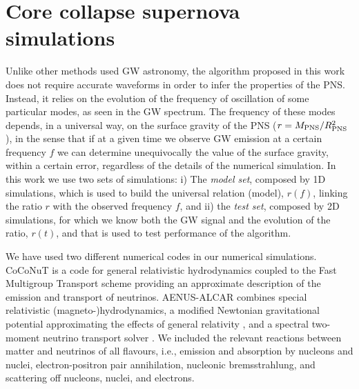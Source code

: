 \section{Core collapse supernova simulations}
\label{sec:simulations}



{Unlike other methods used GW astronomy, the} algorithm proposed in {this work} does not require accurate
waveforms {in order to infer the properties of the PNS.} {Instead, it relies on the evolution of the
frequency of oscillation of some particular modes, as seen in the GW spectrum.
The frequency of these modes depends, in a universal way, on the surface gravity of the PNS
($r=M_{\rm PNS}/R_{\rm PNS}^2$), in the sense that if at a given time we observe GW emission at a certain
frequency $f$ we can determine unequivocally the value of the surface gravity, within a certain error,
regardless of the details of the numerical simulation. In this work we use two sets of simulations: i)
The {\it model set}, composed by 1D simulations, which is used to build the universal relation (model),
$r(f)$, linking the ratio $r$ with the observed frequency $f$, and ii) the {\it test set}, composed by
2D simulations, 
for which we know both the GW signal and the evolution of the ratio, $r (t)$, and that is used to test
performance of the algorithm.}

{We have used two different numerical codes in our numerical simulations.} 
CoCoNuT
\citep{Dimmelmeier:2002,Dimmelmeier:2005} is a code for general
relativistic hydrodynamics coupled to the Fast Multigroup Transport
scheme \citep{Mueller_Janka_2015_FMT} providing an approximate
description of the emission and transport of neutrinos. AENUS-ALCAR
\citep{Just_et_al__2015__mnras__Anewmultidimensionalenergy-dependenttwo-momenttransportcodeforneutrino-hydrodynamics}
combines special relativistic (magneto-)hydrodynamics, a modified
Newtonian gravitational potential approximating the effects of general
relativity \citep{Marek_etal__2006__AA__TOV-potential}, and a spectral
two-moment neutrino transport solver
\citep{Just_et_al__2015__mnras__Anewmultidimensionalenergy-dependenttwo-momenttransportcodeforneutrino-hydrodynamics}.
We included the relevant reactions between matter and neutrinos of all
flavours, i.e., emission and absorption by nucleons and nuclei,
electron-positron pair annihilation, nucleonic bremsstrahlung, and
scattering off nucleons, nuclei, and electrons.

